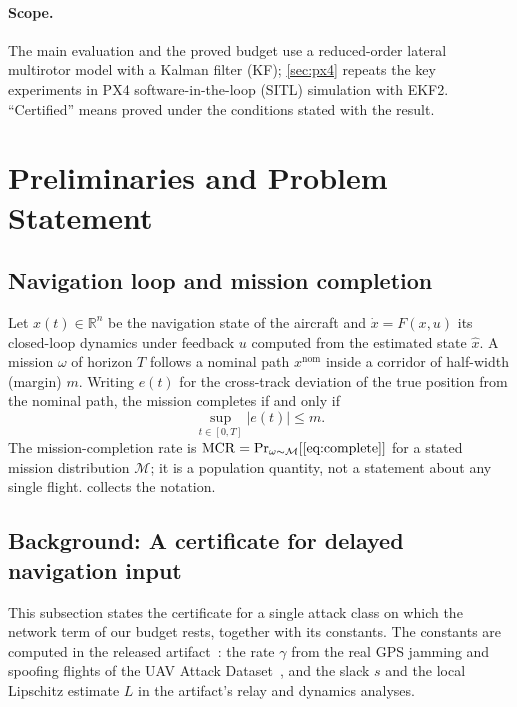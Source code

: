 \documentclass[letterpaper,twocolumn,10pt]{article}
\newcommand{\MCR}{\mathrm{MCR}}
\newcommand{\R}{\mathbb{R}}
\theoremstyle{remark}
\begin{document}
\paragraph{Scope.}
The main evaluation and the proved budget use a reduced-order lateral
multirotor model with a Kalman filter (KF); \cref{sec:px4} repeats the key
experiments in PX4 software-in-the-loop (SITL) simulation with EKF2. ``Certified''
means proved under the conditions stated with the result.

\section{Preliminaries and Problem Statement}
\label{sec:prelim}

\subsection{Navigation loop and mission completion}
Let $x(t)\in\R^n$ be the navigation state of the aircraft and
$\dot x=F(x,u)$ its closed-loop dynamics under feedback $u$ computed from the
estimated state $\hat x$. A mission $\omega$ of horizon $T$ follows a
nominal path $x^{\mathrm{nom}}$ inside a corridor of half-width (margin) $m$.
Writing $e(t)$ for the cross-track deviation of the true position from the
nominal path, the mission completes if and only if
\begin{equation}
\label{eq:complete}
\textstyle \sup_{t\in[0,T]}|e(t)|\le m .
\end{equation}
The mission-completion rate is
$\MCR=\Pr_{\omega\sim\mathcal M}[\eqref{eq:complete}]$ for a stated mission
distribution $\mathcal M$; it is a population quantity, not a statement about
any single flight.  collects the notation.

\subsection{Background: A certificate for delayed navigation input}
\label{sec:background}
This subsection states the certificate for a single attack class on which the
network term of our budget rests, together with its constants. The constants
are computed in the released artifact~\cite{artifact}: the rate $\gamma$ from
the real GPS jamming and spoofing flights of the UAV Attack
Dataset~\cite{whelan2020dataset}, and the slack $s$ and the local Lipschitz
estimate $L$ in the artifact's relay and dynamics analyses.
\end{document}
